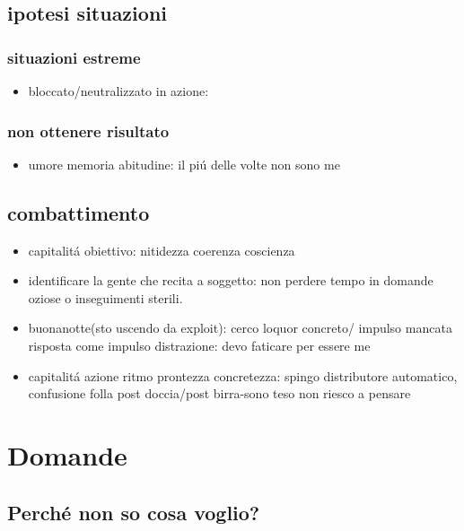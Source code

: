 \section{ipotesi situazioni}

\subsection{situazioni estreme}

\begin{itemize}
\item bloccato/neutralizzato in azione:
\end{itemize}

\subsection{non ottenere risultato}

\begin{itemize}
\item umore memoria abitudine: il pi\'u delle volte non sono me
\end{itemize}

\section{combattimento}

\begin{itemize}
\item capitalit\'a obiettivo: nitidezza coerenza coscienza
\item identificare la gente che recita a soggetto: non perdere tempo in domande oziose o inseguimenti sterili. 
\item buonanotte(sto uscendo da exploit): cerco loquor concreto/ impulso mancata risposta come impulso distrazione: devo faticare per essere me
\item capitalit\'a azione ritmo prontezza concretezza: spingo distributore automatico, confusione folla post doccia/post birra-sono teso non riesco a pensare
\end{itemize}


{\let\clearpage\relax
\chapter{Domande}
}
\PartialToc

\section{Perch\'e non so cosa voglio?}

